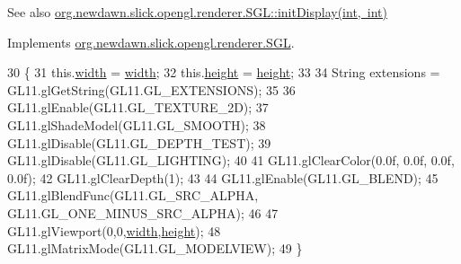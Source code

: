 \begin{DoxySeeAlso}{See also}
\mbox{\hyperlink{interfaceorg_1_1newdawn_1_1slick_1_1opengl_1_1renderer_1_1_s_g_l_a7c5e2c0345c667230bab6bc67865fd24}{org.\+newdawn.\+slick.\+opengl.\+renderer.\+S\+G\+L\+::init\+Display(int, int)}} 
\end{DoxySeeAlso}


Implements \mbox{\hyperlink{interfaceorg_1_1newdawn_1_1slick_1_1opengl_1_1renderer_1_1_s_g_l_a7c5e2c0345c667230bab6bc67865fd24}{org.\+newdawn.\+slick.\+opengl.\+renderer.\+S\+GL}}.


\begin{DoxyCode}
30                                                    \{
31         this.\mbox{\hyperlink{classorg_1_1newdawn_1_1slick_1_1opengl_1_1renderer_1_1_immediate_mode_o_g_l_renderer_a65d0a04d747368ea954f69074d9102d6}{width}} = \mbox{\hyperlink{classorg_1_1newdawn_1_1slick_1_1opengl_1_1renderer_1_1_immediate_mode_o_g_l_renderer_a65d0a04d747368ea954f69074d9102d6}{width}};
32         this.\mbox{\hyperlink{classorg_1_1newdawn_1_1slick_1_1opengl_1_1renderer_1_1_immediate_mode_o_g_l_renderer_aec68994a0ee3b7b478122af823c8a8d7}{height}} = \mbox{\hyperlink{classorg_1_1newdawn_1_1slick_1_1opengl_1_1renderer_1_1_immediate_mode_o_g_l_renderer_aec68994a0ee3b7b478122af823c8a8d7}{height}};
33         
34         String extensions = GL11.glGetString(GL11.GL\_EXTENSIONS);
35         
36         GL11.glEnable(GL11.GL\_TEXTURE\_2D);
37         GL11.glShadeModel(GL11.GL\_SMOOTH);        
38         GL11.glDisable(GL11.GL\_DEPTH\_TEST);
39         GL11.glDisable(GL11.GL\_LIGHTING);                    
40         
41         GL11.glClearColor(0.0f, 0.0f, 0.0f, 0.0f);                
42         GL11.glClearDepth(1);                                       
43         
44         GL11.glEnable(GL11.GL\_BLEND);
45         GL11.glBlendFunc(GL11.GL\_SRC\_ALPHA, GL11.GL\_ONE\_MINUS\_SRC\_ALPHA);
46         
47         GL11.glViewport(0,0,\mbox{\hyperlink{classorg_1_1newdawn_1_1slick_1_1opengl_1_1renderer_1_1_immediate_mode_o_g_l_renderer_a65d0a04d747368ea954f69074d9102d6}{width}},\mbox{\hyperlink{classorg_1_1newdawn_1_1slick_1_1opengl_1_1renderer_1_1_immediate_mode_o_g_l_renderer_aec68994a0ee3b7b478122af823c8a8d7}{height}});
48         GL11.glMatrixMode(GL11.GL\_MODELVIEW);
49     \}
\end{DoxyCode}
\mbox{\label{classorg_1_1newdawn_1_1slick_1_1opengl_1_1renderer_1_1_immediate_mode_o_g_l_renderer_aba41105ecb243a2b925de16fed27abb4}} 
